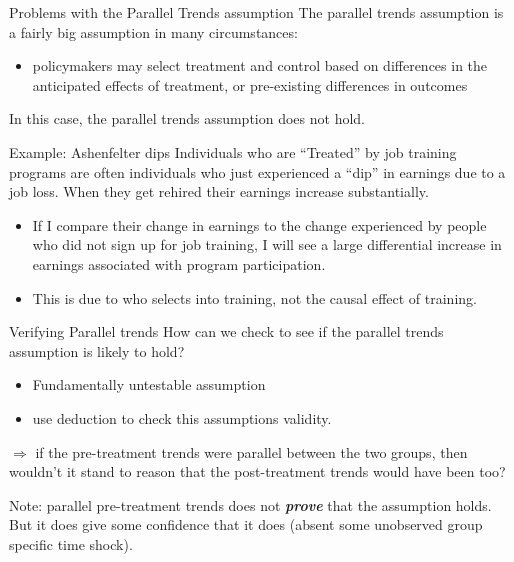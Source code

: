 \documentclass[
  ignorenonframetext,
]{beamer}
\providecommand{\tightlist}{%
  \setlength{\itemsep}{0pt}\setlength{\parskip}{0pt}}
\begin{document}
\begin{frame}{Problems with the Parallel Trends assumption}
\protect\hypertarget{problems-with-the-parallel-trends-assumption}{}
The parallel trends assumption is a fairly big assumption in many
circumstances:

\begin{itemize}
\tightlist
\item
  policymakers may select treatment and control based on differences in
  the anticipated effects of treatment, or pre-existing differences in
  outcomes
\end{itemize}

In this case, the parallel trends assumption does not hold.
\end{frame}

\begin{frame}{Example: Ashenfelter dips}
\protect\hypertarget{example-ashenfelter-dips}{}
Individuals who are ``Treated'' by job training programs are often
individuals who just experienced a ``dip'' in earnings due to a job
loss. When they get rehired their earnings increase substantially.

\begin{itemize}
\item
  If I compare their change in earnings to the change experienced by
  people who did not sign up for job training, I will see a large
  differential increase in earnings associated with program
  participation.
\item
  This is due to who selects into training, not the causal effect of
  training.
\end{itemize}
\end{frame}

\begin{frame}{Verifying Parallel trends}
\protect\hypertarget{verifying-parallel-trends}{}
How can we check to see if the parallel trends assumption is likely to
hold?

\begin{itemize}
\item
  Fundamentally untestable assumption
\item
  use deduction to check this assumptions validity.
\end{itemize}

\(\Rightarrow\) if the pre-treatment trends were parallel between the
two groups, then wouldn't it stand to reason that the post-treatment
trends would have been too?

Note: parallel pre-treatment trends does not \textbf{\textit{prove}}
that the assumption holds. But it does give some confidence that it does
(absent some unobserved group specific time shock).
\end{frame}
\end{document}
